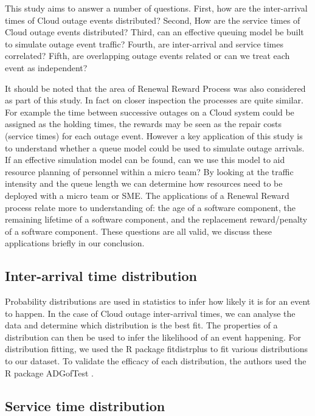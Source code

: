 \documentclass[5p]{elsarticle}
\begin{document}
This study aims to answer a number of questions. First, how are the inter-arrival times of Cloud outage events distributed? Second, How are the service times of Cloud outage events distributed?  Third, can an effective queuing model be built to simulate outage event traffic? Fourth, are inter-arrival and service times correlated? Fifth, are overlapping outage events related or can we treat each event as independent? 

It should be noted that the area of Renewal Reward Process \cite{blackwell1948renewal}\cite{jewell1967simple} was also considered as part of this study. In fact on closer inspection the processes are quite similar.  For example the time between successive outages on a Cloud system could be assigned as the holding times, the rewards may be seen as the repair costs (service times) for each outage event. However a key application of this study is to understand whether a queue model could be used to simulate outage arrivals. If an effective simulation model can be found, can we use this model to aid resource planning of personnel within a micro team? By looking at the traffic intensity and the queue length we can determine how resources need to be deployed with a micro team or SME. The applications of a Renewal Reward process relate more to understanding of: the age of a software component, the remaining lifetime of a software component, and the replacement reward/penalty of a software component. These questions are all valid, we discuss these applications briefly in our conclusion.

\subsection{Inter-arrival time distribution}

Probability distributions are used in statistics to infer how likely it is for an event to happen. In the case of Cloud outage inter-arrival times,  we can analyse the data and determine which distribution is the best fit. The properties of a distribution can then be used to infer the likelihood of an event happening. For distribution fitting, we used the R package fitdistrplus \cite{fitdistrplus} to fit various distributions to our dataset. To validate the efficacy of each distribution,  the authors used the R package ADGofTest \cite{ADGoF}. 

\subsection{Service time distribution}
\end{document}
